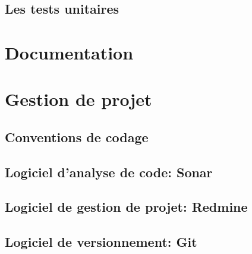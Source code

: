 \documentclass[12pt,a4paper,openany]{article}
\begin{document}
		\subsection{Les tests unitaires}
	\section{Documentation}
	\section{Gestion de projet}
	\subsection{Conventions de codage}
	\subsection{Logiciel d'analyse de code: Sonar}
	\subsection{Logiciel de gestion de projet: Redmine}
	\subsection{Logiciel de versionnement: Git}
\end{document}
